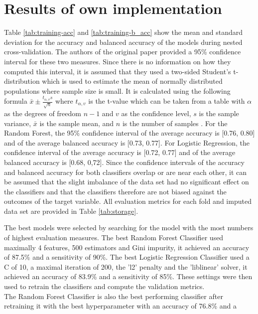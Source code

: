 \section{Results of own implementation}
Table \ref{tab:training-acc} and \ref{tab:training-b_acc} show the mean and 
standard deviation for the accuracy and balanced accuracy of the models during 
nested cross-validation. The authors of the original paper provided a 95\% 
confidence interval for these two measures. Since there is no information on 
how they computed this interval, it is assumed that they used a two-sided 
Student's t-distribution which is used to estimate the mean of normally 
distributed populations where sample size is small. It is calculated using the 
following formula $\bar{x} \pm \frac{t_{\alpha, v}s}{\sqrt{n}}$ where 
$t_{\alpha, v}$ is the t-value which can be taken from a table with $\alpha$ 
as the degrees of freedom $n-1$ and $v$ as the confidence level, $s$ is the 
sample variance, $\bar{x}$ is the sample mean, and $n$ is the number of samples 
\cite{RN197}.
For the Random Forest, the 95\% confidence interval of the average accuracy is 
[0.76, 0.80] and of the average balanced accuracy is [0.73, 0.77]. For Logistic 
Regression, the confidence interval of the average accuracy is [0.72, 0.77] and 
of the average balanced accuracy is [0.68, 0,72]. Since the confidence 
intervals of the accuracy and balanced accuracy for both classifiers overlap or 
are near each other, it can be assumed that the slight imbalance of the data 
set had no significant effect on the classifiers and that the classifiers 
therefore 
are not biased against the outcomes of the target variable. All evaluation 
metrics for each fold and imputed data set are provided in Table 
\ref{tab:storage}.
\par
The best models were selected by searching for the model with the most numbers 
of highest evaluation measures. The best Random Forest Classifier used 
maximally 
4 features, 500 estimators and Gini impurity, it achieved an accuracy of 87.5\% 
and a 
sensitivity of 90\%. The best Logistic Regression Classifier used a C of 10, a 
maximal iteration of 200, the 'l2' penalty and the 'liblinear' solver, it 
achieved an accuracy 
of 83.9\% and a sensitivity of 85\%. These settings were then used to retrain 
the classifiers and compute the validation metrics.
\\
The Random Forest Classifier is also the best performing classifier after 
retraining it with the best hyperparameter with an accuracy of 76.8\% and a 

